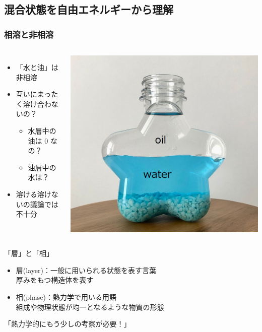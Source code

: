 \documentclass[12pt, dvipdfmx]{beamer}
\begin{document}
\subsection{混合状態を自由エネルギーから理解}
\begin{frame}
	\frametitle{相溶と非相溶}
	\begin{columns}[c, onlytextwidth]
			\begin{itemize}
				\item 「水と油」は非相溶
				\item 互いにまったく溶け合わないの？
				\begin{itemize}
					\item 水層中の油は 0 なの？
					\item 油層中の水は？
				\end{itemize}
				\item 溶ける溶けないの議論では不十分
			\end{itemize}
				\centering
					\includegraphics[width=\textwidth]{oil_water.png}
	\end{columns}

	\pause
	\begin{exampleblock}{「層」と「相」}
		\begin{itemize}
			\item 層(layer)：一般に用いられる状態を表す言葉\\
			厚みをもつ構造体を表す
			\item 相(phase)：\alert{熱力学で用いる用語}\\
			\alert{組成や物理状態が均一}となるような物質の形態
		\end{itemize}
	\end{exampleblock}

	\pause
	\Large
	\centering
	\alert{「熱力学的にもう少しの考察が必要！」}
\end{frame}
\end{document}
